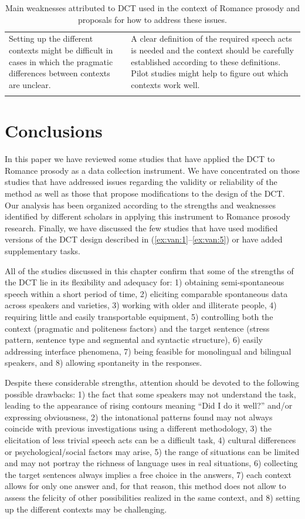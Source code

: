 \documentclass[output=paper]{LSP/langsci}
\begin{document}
\begin{table}
\begin{tabularx}{\textwidth}{@{}p{4.5cm}X@{}}
\tablevspace
Setting up the different contexts might be difficult in cases in which the pragmatic differences between contexts are unclear. & A clear definition of the required speech acts is needed and the context should be carefully established according to these definitions. Pilot studies might help to figure out which contexts work well.\\
\lspbottomrule
\end{tabularx}
\caption{\label{tab:van:3} Main weaknesses attributed to DCT used in the context of Romance prosody and proposals for how to address these issues.}
\end{table}

\section{Conclusions}

In this paper we have reviewed some studies that have applied the DCT to Romance prosody as a data collection instrument. We have concentrated on those studies that have addressed issues regarding the validity or reliability of the method as well as those that propose modifications to the design of the DCT. Our analysis has been organized according to the strengths and weaknesses identified by different scholars in applying this instrument to Romance prosody research. Finally, we have discussed the few studies that have used modified versions of the DCT design described in (\ref{ex:van:1}--\ref{ex:van:5}) or have added supplementary tasks.

All of the studies discussed in this chapter confirm that some of the strengths of the DCT lie in its flexibility and adequacy for: 1) obtaining semi-spontaneous speech within a short period of time, 2) eliciting comparable spontaneous data across speakers and varieties, 3) working with older and illiterate people, 4) requiring little and easily transportable equipment, 5) controlling both the context (pragmatic and politeness factors) and the target sentence (stress pattern, sentence type and segmental and syntactic structure), 6) easily addressing interface phenomena, 7) being feasible for monolingual and bilingual speakers, and 
8) allowing spontaneity in the responses. 


Despite these considerable strengths, attention should be devoted to the following possible drawbacks: 1) the fact that some speakers may not understand the task, leading to the appearance of rising contours meaning “Did I do it well?” and/or expressing obviousness, 2) the intonational patterns found may not always coincide with previous investigations using a different methodology, 3) the elicitation of less trivial speech acts can be a difficult task, 4) cultural differences or psychological/social factors may arise, 5) the range of situations can be limited and may not portray the richness of language uses in real situations, 6) collecting the target sentences always implies a free choice in the answers, 7) each context allows for only one answer and, for that reason, this method does not allow to assess the felicity of other possibilities realized in the same context, and 8) setting up the different contexts may be challenging.
\end{document}
